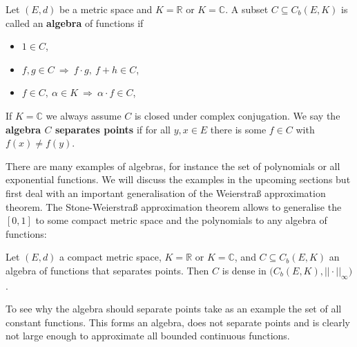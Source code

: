 \begin{ldef}
\begin{deff}\label{def_separating_points}
	Let $(E,d)$ be a metric space and $K = \mathbb{R}$ or $K = \mathbb{C}$. A subset $C \subseteq C_b(E,K)$ is called an \textbf{algebra} of functions if
	\begin{itemize}
		\item $1 \in C$,
		\item $f,g\in C \: \Rightarrow \: f\cdot g, \: f+h \in C$,
		\item $f\in C, \: \alpha \in K \: \Rightarrow \: \alpha \cdot f \in C$,
	\end{itemize}
	 If $K = \mathbb{C}$ we always assume $C$ is closed under complex conjugation. We say the \textbf{algebra $C$ separates points} if for all $y,x\in E$ there is some $f\in C$ with $f(x) \neq f(y)$.
\end{deff}
\end{ldef}
There are many examples of algebras, for instance the set of polynomials or all exponential functions. We will discuss the examples in the upcoming sections but first deal with an important generalisation of the Weierstra\ss{} approximation theorem. The Stone-Weierstra\ss{} approximation theorem allows to generalise the $[0,1]$ to some compact metric space and the polynomials to any algebra of functions:
\begin{lAussageWerkzeug}	
\begin{theorem}\label{Stone_weierstrass}
	Let $(E,d)$ a compact metric space, $K = \mathbb{R}$ or $K = \mathbb{C}$, and $C \subseteq C_b(E, K ) $ an algebra of functions that separates points.
	Then $C$ is dense in $\big( C_b(E,K), ||\cdot||_\infty \big)$.
\end{theorem}
\end{lAussageWerkzeug}
To see why the algebra should separate points take as an example the set of all constant functions. This forms an algebra, does not separate points and is clearly not large enough to approximate all bounded continuous functions.

